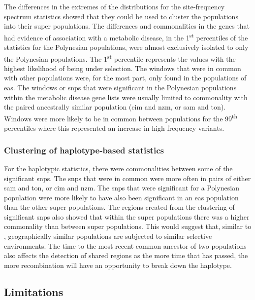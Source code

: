 \documentclass[twoside,openright]{report}
\begin{document}
The differences in the extremes of the distributions for the
site-frequency spectrum statistics showed that they could be used to
cluster the populations into their super populations. The differences
and commonalities in the genes that had evidence of association with a
metabolic disease, in the 1\textsuperscript{st} percentiles of the
statistics for the Polynesian populations, were almost exclusively
isolated to only the Polynesian populations. The 1\textsuperscript{st}
percentile represents the values with the highest likelihood of being
under selection. The windows that were in common with other populations
were, for the most part, only found in the populations of \gls{eas}. The
windows or \glspl{snp} that were significant in the Polynesian
populations within the metabolic disease gene lists were usually limited
to commonality with the paired ancestrally similar population (\gls{cim}
and \gls{nzm}, or \gls{sam} and \gls{ton}). Windows were more likely to
be in common between populations for the 99\textsuperscript{th}
percentiles where this represented an increase in high frequency
variants.

\subsubsection{Clustering of haplotype-based
statistics}\label{clustering-of-haplotype-based-statistics}

For the haplotypic statistics, there were commonalities between some of
the significant \glspl{snp}. The \glspl{snp} that were in common were
more often in pairs of either \gls{sam} and \gls{ton}, or \gls{cim} and
\gls{nzm}. The \glspl{snp} that were significant for a Polynesian
population were more likely to have also been significant in an
\gls{eas} population than the other super populations. The regions
created from the clustering of significant \glspl{snp} also showed that
within the super populations there was a higher commonality than between
super populations. This would suggest that, similar to \citet{Coop2009},
geographically similar populations are subjected to similar selective
environments. The time to the most recent common ancestor of two
populations also affects the detection of shared regions as the more
time that has passed, the more recombination will have an opportunity to
break down the haplotype.

\subsection{Limitations}\label{chap4limit}
\end{document}
